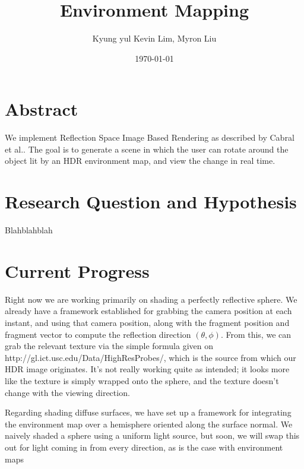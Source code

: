 \documentclass[12pt]{article}
\begin{document}
\title{Environment Mapping}
\author{Kyung yul Kevin Lim, Myron Liu}
\date{\today}
\maketitle

\section{Abstract}
We implement Reflection Space Image Based Rendering as described by Cabral et al.\cite{cabral1999reflection}. The goal is to generate a scene in which the user can rotate around the object lit by an HDR environment map, and view the change in real time.

\section{Research Question and Hypothesis}
Blahblahblah

\section{Current Progress}


Right now we are working primarily on shading a perfectly reflective sphere. We already have a framework established for grabbing the camera position at each instant, and using that camera position, along with the fragment position and fragment vector to compute the reflection direction $(\theta,\phi)$. From this, we can grab the relevant texture via the simple formula given on http://gl.ict.usc.edu/Data/HighResProbes/, which is the source from which our HDR image originates. It's not really working quite as intended; it looks more like the texture is simply wrapped onto the sphere, and the texture doesn't change with the viewing direction.

Regarding shading diffuse surfaces, we have set up a framework for integrating the environment map over a hemisphere oriented along the surface normal. We naively shaded a sphere using a uniform light source, but soon, we will swap this out for light coming in from every direction, as is the case with environment maps

%
%
\end{document}
